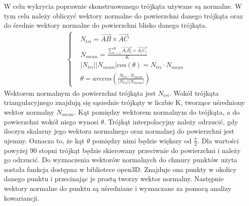W celu wykrycia poprawnie skonstruowanego trójkąta używane są normalne. W tym celu należy obliczyć wektory normalne do powierzchni danego trójkąta oraz do średnie wektory normalne do powierzchni blisko danego trójkąta. 
\begin{equation}
    \begin{aligned} 
    \begin{cases}
            &N_{tri}=\vec{AB} \times \vec{AC}\\
            &N_{mean}=\frac{\sum_{i=1}^{K} \vec{A_{i}B_{i}} \times \vec{A_{i}C_{i}}}{K}\\
            & |N_{tri}||N_{mean}|cos(\theta)=N_{tri} \cdot N_{mean}\\
            &\theta=arccos(\frac{N_{tri} \cdot N_{mean}}{|N_{tri}||N_{mean}|})
    \end{cases}
    \end{aligned}
\end{equation}
\indent Wektorem normalnym do powierzchni trójkąta jest $N_{tri}$. Wokół trójkąta triangulacyjnego znajdują się sąsiednie trójkąty w liczbie K, tworzące uśredniony wektor normalny $N_{mean}$. Kąt pomiędzy wektorem normalnym do trójkąta, a do powierzchni wokół niego wynosi $\theta$.
\newline \indent Trójkąt interpolacyjny należy odrzucić, gdy iloczyn skalarny jego wektora normalnego oraz normalnej do powierzchni jest ujemny. Oznacza to, że kąt $\theta$ pomiędzy nimi będzie większy od $\frac{\pi}{2}$. Dla wartości powyżej 90 stopni trójkąt będzie skierowany przeciwnie do powierzchni i należy go odrzucić. Do wyznaczenia wektorów normalnych do chmury punktów użyta została funkcja dostępna w bibliotece open3D. Znajduje ona punkty w okolicy danego punktu i przecinając je prostą tworzy wektor normalny. Następnie wektory normalne do punktu są uśredniane i wyznaczane za pomocą analizy kowariancji.
